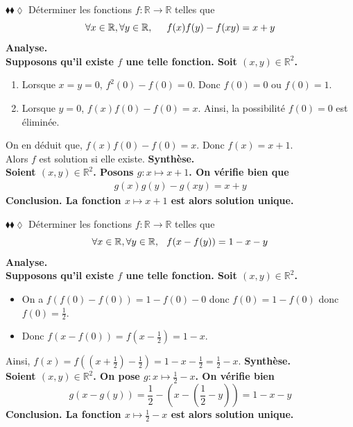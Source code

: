 \documentclass[11pt]{article}
\begin{document}
\begin{exercice}{$\blacklozenge\blacklozenge\lozenge$}{}
    Déterminer les fonctions $f: \mathbb{R} \rightarrow \mathbb{R}$ telles que 
    \begin{equation*}
        \forall{x\in\mathbb{R},\forall{y\in\mathbb{R}}, \hspace{0.5cm} f(x)f(y) - f(xy) = x + y}
    \end{equation*}
    \tcblower
    \bf{Analyse.}\\
    Supposons qu'il existe $f$ une telle fonction. Soit $(x,y)\in\mathbb{R}^2$.
    \begin{enumerate}
        \item Lorsque $x=y=0$, $f^2(0)-f(0)=0$. Donc $f(0) = 0$ ou $f(0) = 1$.
        \item Lorsque $y=0$, $f(x)f(0)-f(0)=x$. Ainsi, la possibilité $f(0)=0$ est éliminée.
    \end{enumerate}
    On en déduit que, $f(x)f(0)-f(0)=x$. Donc $f(x)=x+1$.\\
    Alors $f$ est solution si elle existe.\n
    \bf{Synthèse.}\\
    Soient $(x,y)\in\mathbb{R}^2$. Posons $g:x\mapsto x+1$. On vérifie bien que
    \begin{align*}
        g(x)g(y)-g(xy)=x+y
    \end{align*}
    \bf{Conclusion.} La fonction $x\mapsto x+1$ est alors solution unique.
\end{exercice}

\begin{exercice}{$\blacklozenge\blacklozenge\lozenge$}{}
    Déterminer les fonctions $f: \mathbb{R} \rightarrow \mathbb{R}$ telles que 
    \begin{equation*}
        \forall{x\in\mathbb{R}},\forall{y\in\mathbb{R}}, \hspace{0.25cm} f(x-f(y)) = 1-x-y
    \end{equation*}
    \tcblower
    \bf{Analyse.}\\
    Supposons qu'il existe $f$ une telle fonction. Soit $(x,y)\in\mathbb{R}^2$.
    \begin{itemize}
        \item[1.] On a $f(f(0)-f(0))=1-f(0)-0$ donc $f(0)=1-f(0)$ donc $f(0)=\frac{1}{2}$.
        \item[2.] Donc $f(x-f(0))=f(x-\frac{1}{2})=1-x$.
    \end{itemize}
    Ainsi, $f(x)=f((x+\frac{1}{2})-\frac{1}{2})=1-x-\frac{1}{2}=\frac{1}{2}-x$.\n
    \bf{Synthèse.}\\
    Soient $(x,y)\in\mathbb{R}^2$. On pose $g:x\mapsto\frac{1}{2}-x$. On vérifie bien
    \begin{equation*}
        g(x-g(y)) = \frac{1}{2} - (x - (\frac{1}{2}-y)) = 1-x-y
    \end{equation*}
    \bf{Conclusion.} La fonction $x\mapsto\frac{1}{2}-x$ est alors solution unique.
\end{exercice}
\end{document}
